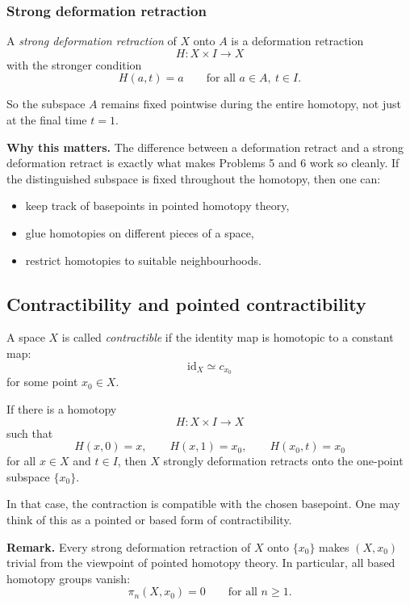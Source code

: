 \documentclass[12pt,a4paper]{article}
\theoremstyle{notespace}
\begin{document}
\subsubsection{Strong deformation retraction}

A \emph{strong deformation retraction} of \(X\) onto \(A\) is a deformation retraction
\[
H:X\times I\to X
\]
with the stronger condition
\[
H(a,t)=a
\qquad\text{for all }a\in A,\ t\in I.
\]

So the subspace \(A\) remains fixed pointwise during the entire homotopy, not just at the final time \(t=1\).

\medskip

\textbf{Why this matters.}
The difference between a deformation retract and a strong deformation retract is exactly what makes Problems 5 and 6 work so cleanly. If the distinguished subspace is fixed throughout the homotopy, then one can:

\begin{itemize}
	\item keep track of basepoints in pointed homotopy theory,
	\item glue homotopies on different pieces of a space,
	\item restrict homotopies to suitable neighbourhoods.
\end{itemize}

\subsection{Contractibility and pointed contractibility}

A space \(X\) is called \emph{contractible} if the identity map is homotopic to a constant map:
\[
\mathrm{id}_X \simeq c_{x_0}
\]
for some point \(x_0\in X\).

If there is a homotopy
\[
H:X\times I\to X
\]
such that
\[
H(x,0)=x,
\qquad
H(x,1)=x_0,
\qquad
H(x_0,t)=x_0
\]
for all \(x\in X\) and \(t\in I\), then \(X\) strongly deformation retracts onto the one-point subspace \(\{x_0\}\).

In that case, the contraction is compatible with the chosen basepoint. One may think of this as a pointed or based form of contractibility.

\medskip

\textbf{Remark.}
Every strong deformation retraction of \(X\) onto \(\{x_0\}\) makes \((X,x_0)\) trivial from the viewpoint of pointed homotopy theory. In particular, all based homotopy groups vanish:
\[
\pi_n(X,x_0)=0
\qquad\text{for all }n\geq 1.
\]
\end{document}
